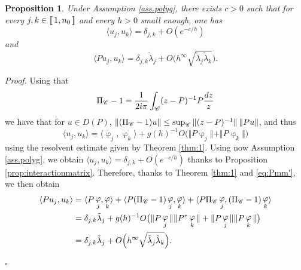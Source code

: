 \documentclass[12pt]{amsart}
\def\<{\langle}
\def\>{\rangle}
\newcommand{\bp}{{\it Proof. }}
\newcommand{\ep}{\hfill $\square$}
\numberwithin{equation}{section}
\numberwithin{figure}{section}
\DeclareMathOperator{\phii}{\varphi}
\newcommand{\vvert}[1]{\left\lVert#1\right\rVert}
\newcommand{\lb}{\operatorname{[\negthinspace [}}
\newcommand{\rb}{\operatorname{]\negthinspace ]}}
\newtheorem{proposition}[defin]{Proposition}
\begin{document}
\begin{proposition}
    Under Assumption \ref{ass.polyg}, there exists $c>0$ such that for every $j,k\in\lb1,n_0\rb$ and every $h>0$ small enough, one has
    \begin{equation}\label{eq:quasiortho}
    \<u_j,u_k\> = \delta_{j,k} + O(e^{-c/h})
    \end{equation}
    and
    \begin{equation}\label{eq:interaction}
    \<Pu_j,u_k\> = \delta_{j,k}\tilde{\lambda}_j + O\Big(h^\infty\sqrt{\tilde{\lambda}_j\tilde{\lambda}_k}\Big).
    \end{equation}
\end{proposition}

\bp Using that
\begin{equation*}
\Pi_{\mathscr C}-1 = \frac{1}{2i\pi}\int_{{\mathscr C}}(z-P)^{-1}P\frac{dz}{z}
\end{equation*}
we have that for $u\in D(P)$, $\vvert{(\Pi_\Cr-1)u}\leq\sup_{\Cr}\Vert(z-P)^{-1}\Vert\vvert{Pu}$, and thus
\begin{equation*}
\<u_j,u_k\> = \<\phii_j,\phii_k\> + g(h)^{-1}O\big(\Vert P\phii_j\Vert + \Vert P\phii_k\Vert\big)
\end{equation*}
using the resolvent estimate given by Theorem \ref{thm:1}. Using now Assumption \ref{ass.polyg}, we obtain $\<u_j,u_k\> = \delta_{j,k} + O(e^{-c/h})$ thanks to Proposition \ref{prop:interactionmatrix}. Therefore, thanks to Theorem \ref{thm:1} and \eqref{eq:Pmm'}, we then obtain
\begin{equation*}
\begin{aligned}
    \<Pu_j,u_k\> &= \<P\phii_j,\phii_k\> + \<P(\Pi_\Cr-1)\phii_j,\phii_k\> + \<P\Pi_\Cr\phii_j,(\Pi_\Cr-1)\phii_k\>\\
    &= \delta_{j,k}\tilde{\lambda}_j + g(h)^{-1}O\big(\Vert P\phii_j\Vert\Vert P^*\phii_k\Vert + \Vert P\phii_j\Vert\Vert P\phii_k\Vert\big)\\
    &= \delta_{j,k}\tilde{\lambda}_j + O\Big(h^\infty\sqrt{\tilde{\lambda}_{j}\tilde{\lambda}_{k}}\Big).
\end{aligned}
\end{equation*}

\ep
\end{document}
